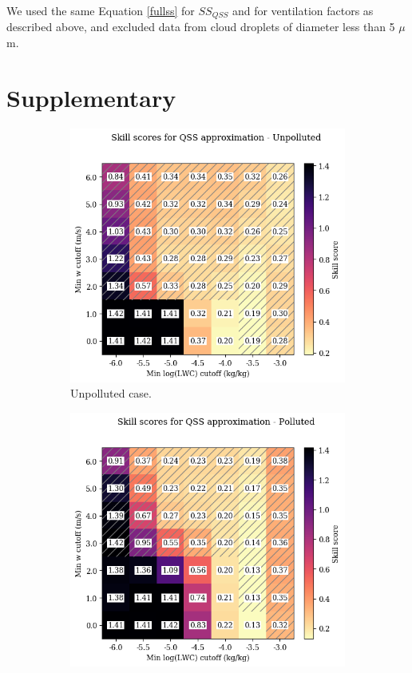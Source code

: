 \documentclass{article}
\begin{document}
We used the same Equation \ref{fullss} for $SS_{QSS}$ and for ventilation factors as described above, and excluded data from cloud droplets of diameter less than 5 $\mu$m.

\clearpage
\newpage

\section{Supplementary}

\begin{figure}[ht]
	\centering
	\begin{subfigure}{1\textwidth}
		\includegraphics[width=\textwidth]{wrf/filtering_criteria_separate_Unpolluted_figure.png}
		\caption{Unpolluted case.}
		\label{filtcritheatmapsepunpoll}
	\end{subfigure}
	\begin{subfigure}{1\textwidth}
		\includegraphics[width=\textwidth]{wrf/filtering_criteria_separate_Polluted_figure.png}

\end{subfigure}
\end{figure}
\end{document}
